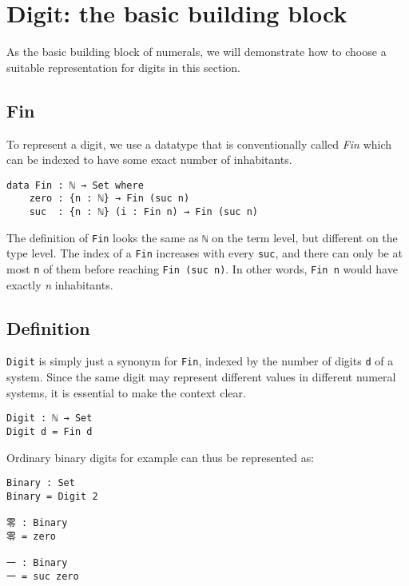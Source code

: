 \documentclass[\main/thesis.tex]{subfiles}
\begin{document}
\section{Digit: the basic building block}\label{digit}

As the basic building block of numerals, we will demonstrate how to choose a
suitable representation for digits in this section.

\subsection{Fin}

To represent a digit, we use a datatype that is conventionally called \textit{Fin}
which can be indexed to have some exact number of inhabitants.

\begin{lstlisting}
data Fin : ℕ → Set where
    zero : {n : ℕ} → Fin (suc n)
    suc  : {n : ℕ} (i : Fin n) → Fin (suc n)
\end{lstlisting}

The definition of {\lstinline|Fin|} looks the same as {\lstinline|ℕ|} on the term
level, but different on the type level. The index of a {\lstinline|Fin|} increases
with every {\lstinline|suc|}, and there can only be at most {\lstinline|n|} of
them before reaching {\lstinline|Fin (suc n)|}. In other words, {\lstinline|Fin n|}
would have exactly \textit{n} inhabitants.

\subsection{Definition}

{\lstinline|Digit|} is simply just a synonym for {\lstinline|Fin|}, indexed by
the number of digits {\lstinline|d|} of a system.
Since the same digit may represent different values in different numeral systems,
it is essential to make the context clear.

\begin{lstlisting}
Digit : ℕ → Set
Digit d = Fin d
\end{lstlisting}

Ordinary binary digits for example can thus be represented as:

\begin{lstlisting}
Binary : Set
Binary = Digit 2

零 : Binary
零 = zero

一 : Binary
一 = suc zero
\end{lstlisting}
\end{document}
